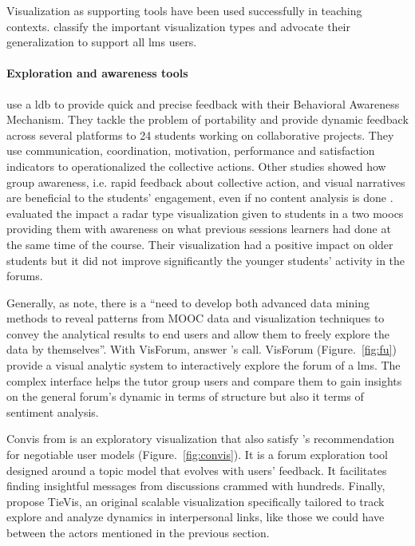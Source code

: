 \documentclass[a4paper,twoside]{article}
\begin{document}
Visualization as supporting tools have been used successfully in teaching contexts. \cite{Heer2012} classify the important visualization types and \cite{Emmons2017,Leeuwen2014} advocate their generalization to support all \gls{lms} users.

\paragraph{Exploration and awareness tools}
\cite{Medina2016} use a \gls{ldb} to provide quick and precise feedback with their Behavioral Awareness Mechanism.  They tackle the problem of portability and provide dynamic feedback across several platforms to 24 students working on collaborative projects.  They use communication, coordination, motivation, performance and satisfaction indicators to operationalized the collective actions.  Other studies showed how group awareness, i.e. rapid feedback about collective action, and visual narratives \citep{Yousuf2015} are beneficial to the students' engagement, even if no content analysis is done \citep{Davis2017,May2011,Medina2016}.
\cite{Davis2017} evaluated the impact a radar type visualization given to students in a two \glspl{mooc} providing them with awareness on what previous sessions learners had done at the same time of the course.  Their visualization had a positive impact on older students but it did not improve significantly the younger students' activity in the forums.

Generally, as \cite{Qu2015} note, there is a  ``need to develop both advanced data mining methods to reveal patterns from MOOC data and visualization techniques to convey the analytical results to end users and allow them to freely explore the data by themselves''.
With VisForum, \cite{Fu2017} answer  \cite{Qu2015}'s call.  VisForum  (Figure.~\ref{fig:fu}) provide a visual analytic system to interactively explore the forum of a \gls{lms}.  The complex interface helps the tutor group users and compare them to gain insights on the general forum's dynamic in terms of structure but also it terms of sentiment analysis.

Convis from \cite{Hoque2016} is an exploratory visualization that also satisfy \cite{Bull2016}'s recommendation for negotiable user models (Figure.~\ref{fig:convis}).  It is a forum exploration tool designed around a topic model that evolves with users' feedback.   It facilitates finding insightful messages from discussions
crammed with hundreds.
Finally, \cite{Guo2017} propose TieVis, an original scalable visualization specifically tailored to track explore and analyze dynamics in interpersonal links, like those we could have between the actors mentioned in the previous section.
\end{document}
